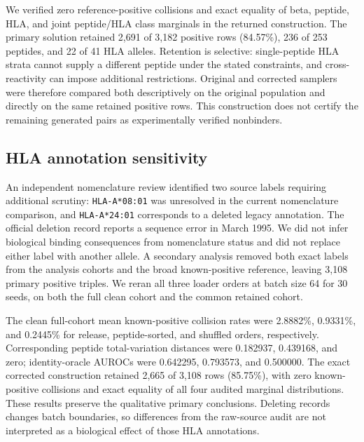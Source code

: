 We verified zero reference-positive collisions and exact equality of beta,
peptide, HLA, and joint peptide/HLA class marginals in the returned construction.
The primary solution retained 2,691 of 3,182 positive rows (84.57\%), 236 of 253
peptides, and 22 of 41 HLA alleles. Retention is selective: single-peptide HLA
strata cannot supply a different peptide under the stated constraints, and
cross-reactivity can impose additional restrictions. Original and corrected
samplers were therefore compared both descriptively on the original population
and directly on the same retained positive rows. This construction does not
certify the remaining generated pairs as experimentally verified nonbinders.

\subsection{HLA annotation sensitivity}
An independent nomenclature review identified two source labels requiring
additional scrutiny: \texttt{HLA-A*08:01} was unresolved in the current
nomenclature comparison, and \texttt{HLA-A*24:01} corresponds to a deleted legacy
annotation. The official deletion record reports a sequence error in March
1995. We did not infer biological binding consequences from nomenclature status
and did not replace either label with another allele. A secondary analysis
removed both exact labels from the analysis cohorts and the broad known-positive
reference, leaving 3,108 primary positive triples. We reran all three loader
orders at batch size 64 for 30 seeds, on both the full clean cohort and the
common retained cohort.

The clean full-cohort mean known-positive collision rates were 2.8882\%,
0.9331\%, and 0.2445\% for release, peptide-sorted, and shuffled orders,
respectively. Corresponding peptide total-variation distances were 0.182937,
0.439168, and zero; identity-oracle AUROCs were 0.642295, 0.793573, and 0.500000.
The exact corrected construction retained 2,665 of 3,108 rows (85.75\%), with
zero known-positive collisions and exact equality of all four audited marginal
distributions. These results preserve the qualitative primary conclusions.
Deleting records changes batch boundaries, so differences from the raw-source
audit are not interpreted as a biological effect of those HLA annotations.

